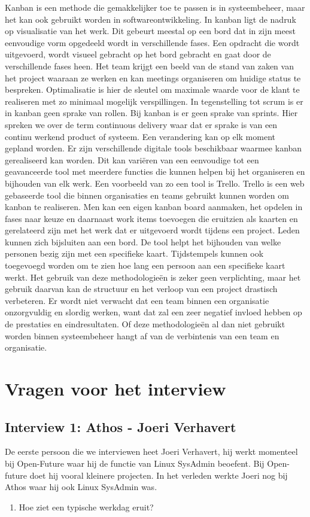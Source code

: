 \documentclass{hogent-article}
\begin{document}
    Kanban is een methode die gemakkelijker toe te passen is in systeembeheer, maar het kan ook gebruikt worden in softwareontwikkeling. In kanban ligt de nadruk op visualisatie van het werk. Dit gebeurt meestal op een bord dat in zijn meest eenvoudige vorm opgedeeld wordt in verschillende fases. Een opdracht die wordt uitgevoerd, wordt visueel gebracht op het bord gebracht en gaat door de verschillende fases heen. Het team krijgt een beeld van de stand van zaken van het project waaraan ze werken en kan meetings organiseren om huidige status te bespreken. Optimalisatie is hier de sleutel om maximale waarde voor de klant te realiseren met zo minimaal mogelijk verspillingen. In tegenstelling tot scrum is er in kanban geen sprake van rollen. Bij kanban is er geen sprake van sprints. Hier spreken we over de term continuous delivery waar dat er sprake is van een continu werkend product of systeem. Een verandering kan op elk moment gepland worden. 
    Er zijn verschillende digitale tools beschikbaar waarmee kanban gerealiseerd kan worden. Dit kan variëren van een eenvoudige tot een geavanceerde tool met meerdere functies die kunnen helpen bij het organiseren en bijhouden van elk werk. Een voorbeeld van zo een tool is Trello. Trello is een web gebaseerde tool die binnen organisaties en teams gebruikt kunnen worden om kanban te realiseren. Men kan een eigen kanban board aanmaken, het opdelen in fases naar keuze en daarnaast work items toevoegen die eruitzien als kaarten en gerelateerd zijn met het werk dat er uitgevoerd wordt tijdens een project. Leden kunnen zich bijsluiten aan een bord. De tool helpt het bijhouden van welke personen bezig zijn met een specifieke kaart. Tijdstempels kunnen ook toegevoegd worden om te zien hoe lang een persoon aan een specifieke kaart werkt. 
    Het gebruik van deze methodologieën is zeker geen verplichting, maar het gebruik daarvan kan de structuur en het verloop van een project drastisch verbeteren. Er wordt niet verwacht dat een team binnen een organisatie onzorgvuldig en slordig werken, want dat zal een zeer negatief invloed hebben op de prestaties en eindresultaten. Of deze methodologieën al dan niet gebruikt worden binnen systeembeheer hangt af van de verbintenis van een team en organisatie. 
       
    
    \section{Vragen voor het interview}    
    \subsection{Interview 1: Athos - Joeri Verhavert}
    De eerste persoon die we interviewen heet Joeri Verhavert, hij werkt momenteel bij Open-Future waar hij de functie van Linux SysAdmin beoefent. Bij Open-future doet hij vooral kleinere projecten. In het verleden werkte Joeri nog bij Athos waar hij ook Linux SysAdmin was. 
    \\
    \begin{enumerate}\bfseries
        \item Hoe ziet een typische werkdag eruit?
    \end{enumerate}
\end{document}
